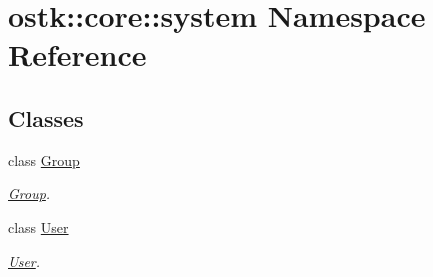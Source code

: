 \hypertarget{namespaceostk_1_1core_1_1system}{}\section{ostk\+:\+:core\+:\+:system Namespace Reference}
\label{namespaceostk_1_1core_1_1system}
\subsection*{Classes}
\begin{DoxyCompactItemize}
\item 
class \hyperlink{classostk_1_1core_1_1system_1_1_group}{Group}
\begin{DoxyCompactList}\small\item\em \hyperlink{classostk_1_1core_1_1system_1_1_group}{Group}. \end{DoxyCompactList}\item 
class \hyperlink{classostk_1_1core_1_1system_1_1_user}{User}
\begin{DoxyCompactList}\small\item\em \hyperlink{classostk_1_1core_1_1system_1_1_user}{User}. \end{DoxyCompactList}\end{DoxyCompactItemize}
